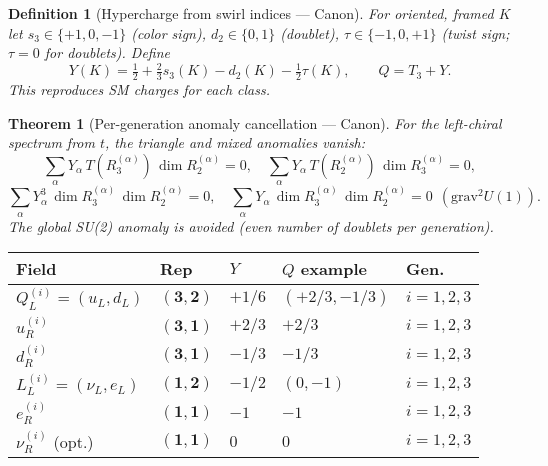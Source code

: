 \documentclass[11pt]{article}
\newtheorem{theorem}{Theorem}[section]
\newtheorem{definition}{Definition}[section]
\begin{document}
\begin{definition}[Hypercharge from swirl indices — Canon]
    For oriented, framed $K$ let $s_3\!\in\!\{+1,0,-1\}$ (color sign), $d_2\!\in\!\{0,1\}$ (doublet),
    $\tau\!\in\!\{-1,0,+1\}$ (twist sign; $\tau\!=\!0$ for doublets). Define
    \[
        Y(K)=\tfrac{1}{2}+\tfrac{2}{3}s_3(K)-d_2(K)-\tfrac{1}{2}\tau(K),\qquad Q=T_3+Y.
    \]
    This reproduces SM charges for each class.
\end{definition}

\begin{theorem}[Per-generation anomaly cancellation — Canon]
    For the left-chiral spectrum from $t$, the triangle and mixed anomalies vanish:
    \[
        \sum_\alpha Y_\alpha\,T(R^{(\alpha)}_3)\,\dim R^{(\alpha)}_2=0,\quad
        \sum_\alpha Y_\alpha\,T(R^{(\alpha)}_2)\,\dim R^{(\alpha)}_3=0,
    \]
    \[
        \sum_\alpha Y_\alpha^{3}\,\dim R^{(\alpha)}_3\,\dim R^{(\alpha)}_2=0,\quad
        \sum_\alpha Y_\alpha\,\dim R^{(\alpha)}_3\,\dim R^{(\alpha)}_2=0\ \ (\mathrm{grav}^2U(1)).
    \]
    The global SU(2) anomaly is avoided (even number of doublets per generation).
\end{theorem}

\begin{table}[t]\centering\small
    \begin{tabular}{@{}lllll@{}}\toprule
        Field & Rep & $Y$ & $Q$ example & Gen.\\\midrule
        $Q_L^{(i)}=(u_L,d_L)$ & $(\mathbf 3,\mathbf 2)$ & $+1/6$ & $(+2/3,-1/3)$ & $i=1,2,3$\\
        $u_R^{(i)}$ & $(\mathbf 3,\mathbf 1)$ & $+2/3$ & $+2/3$ & $i=1,2,3$\\
        $d_R^{(i)}$ & $(\mathbf 3,\mathbf 1)$ & $-1/3$ & $-1/3$ & $i=1,2,3$\\
        $L_L^{(i)}=(\nu_L,e_L)$ & $(\mathbf 1,\mathbf 2)$ & $-1/2$ & $(0,-1)$ & $i=1,2,3$\\
        $e_R^{(i)}$ & $(\mathbf 1,\mathbf 1)$ & $-1$ & $-1$ & $i=1,2,3$\\
        $\nu_R^{(i)}$ (opt.) & $(\mathbf 1,\mathbf 1)$ & $0$ & $0$ & $i=1,2,3$\\
        \bottomrule
    \end{tabular}
\end{table}
\end{document}
